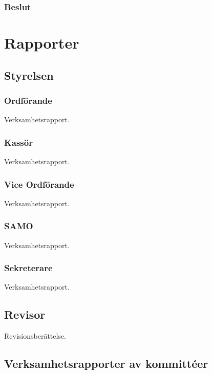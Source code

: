 \documentclass[protokoll]{dvd}
\begin{document}
\subsubsection*{Beslut}
\begin{attsatser}
    \item %
\end{attsatser}

\newpage

\section{Rapporter}

\subsection{Styrelsen}

\subsubsection*{Ordförande}
Verksamhetsrapport.

\subsubsection*{Kassör}
Verksamhetsrapport.

\subsubsection*{Vice Ordförande}
Verksamhetsrapport.


\subsubsection*{SAMO}
Verksamhetsrapport.


\subsubsection*{Sekreterare}
Verksamhetsrapport.

\subsection{Revisor}
Revisionsberättelse.

\subsection{Verksamhetsrapporter av kommittéer}
\end{document}
